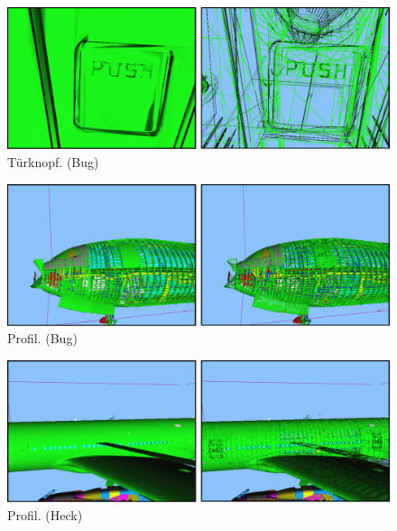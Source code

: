 \begin{figure}
\centering
\includegraphics[width=\hsize]{images/button.pdf}
\caption{\label{fig:eval:button}Türknopf. (Bug)}
\end{figure}
\vspace{0.9cm}
\begin{figure}
\centering
\includegraphics[width=\hsize]{images/profil_bug.pdf}
\caption{\label{fig:eval:prof_bug}Profil. (Bug)}
\end{figure}
\vspace{0.9cm}
\begin{figure}
\centering
\includegraphics[width=\hsize]{images/profil_heck.pdf}
\caption{\label{fig:eval:prof_heck}Profil. (Heck)}
\end{figure}

